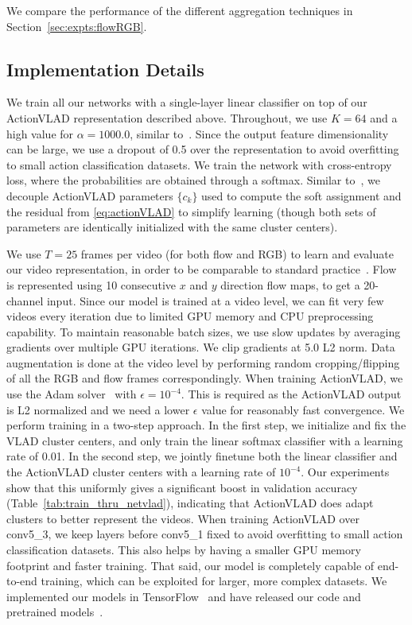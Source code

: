 \documentclass[10pt,twocolumn,letterpaper]{article}
\newcommand{\methodTag}[0]{ActionVLAD}
\begin{document}
We compare the performance of the different aggregation techniques in Section~\ref{sec:expts:flowRGB}.


\subsection{Implementation Details}\label{sec:impl-details}


We train all our networks with a single-layer linear
classifier on top of our \methodTag{} representation
described above. Throughout, we use $K=64$
and a high value for $\alpha=1000.0$, similar to~\cite{Arandjelovic16}.
Since the output feature dimensionality can be
large, we use a dropout of 0.5 over the 
representation to avoid overfitting to small action classification
datasets. We train the network with cross-entropy loss, where 
the probabilities are obtained through a softmax. Similar
to~\cite{Arandjelovic16}, we decouple \methodTag{} parameters $\{c_k\}$ used to compute the soft assignment and the residual from \eqref{eq:actionVLAD} to simplify learning (though both sets of parameters are identically initialized with the same cluster centers).

We use $T=25$ frames per video (for both flow and RGB) to learn and evaluate our video representation,
in order to be comparable to standard practice~\cite{Simonyan_14b,WangL_16a}.
Flow is represented using 10 consecutive $x$ and $y$ direction flow maps, to get 
a 20-channel input.
Since our model is trained at a video level, we can fit very few videos every iteration
due to limited GPU memory and CPU preprocessing capability. To maintain reasonable batch sizes, we use slow updates by 
averaging gradients over multiple GPU iterations.
We clip gradients at 5.0 L2 norm.
Data augmentation is done at the video level by 
performing random cropping/flipping of all the RGB and flow
frames correspondingly.
When training \methodTag{}, we use the Adam solver~\cite{Kingma14} with
$\epsilon=10^{-4}$. This is required as the \methodTag{} output is L2 normalized
and we need a lower $\epsilon$ value for reasonably fast convergence.
We perform training in a two-step approach. In
the first step, we initialize and fix the VLAD cluster centers,
and only train the linear softmax
classifier with a learning rate of 0.01.
In the second step, we jointly finetune both
the linear classifier and the \methodTag{}
cluster centers with a learning 
rate of $10^{-4}$.
Our experiments show that this uniformly gives a significant boost in validation accuracy (Table~\ref{tab:train_thru_netvlad}), indicating that \methodTag{} does adapt clusters to better represent the videos.
When training \methodTag{} over conv5\_3,
we keep layers before conv5\_1 fixed
to avoid overfitting to small action classification datasets.
This also helps by having a smaller GPU memory footprint and faster training.
That said, our model is completely capable of end-to-end training,
which can be exploited for larger, more complex datasets.
We implemented our models in TensorFlow~\cite{tensorflow2015-whitepaper} and have released our code and pretrained models~\cite{webpage}.
\end{document}
